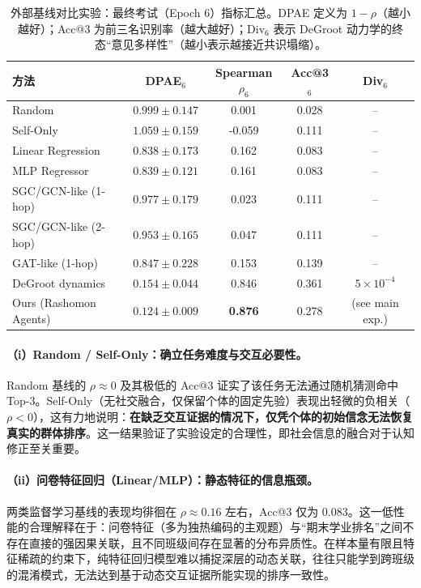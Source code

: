 \documentclass[UTF8, a4paper, 11pt]{ctexart}
\begin{document}
\begin{table}[!htbp]
\centering
\small
\begin{tabular}{lcccc}
\toprule
方法 & DPAE$_6$ & Spearman $\rho_6$ & Acc@3$_6$ & Div$_6$ \\
\midrule
Random & $0.999\pm0.147$ & 0.001 & 0.028 & -- \\
Self-Only & $1.059\pm0.159$ & -0.059 & 0.111 & -- \\
Linear Regression & $0.838\pm0.173$ & 0.162 & 0.083 & -- \\
MLP Regressor & $0.839\pm0.121$ & 0.161 & 0.083 & -- \\
\midrule
SGC/GCN-like (1-hop) & $0.977\pm0.179$ & 0.023 & 0.111 & -- \\
SGC/GCN-like (2-hop) & $0.953\pm0.165$ & 0.047 & 0.111 & -- \\
GAT-like (1-hop) & $0.847\pm0.228$ & 0.153 & 0.139 & -- \\
DeGroot dynamics & $0.154\pm0.044$ & 0.846 & 0.361 & $5\times10^{-4}$ \\
\midrule
Ours (Rashomon Agents) & $\mathbf{0.124\pm0.009}$ & \textbf{0.876} & 0.278 & (see main exp.) \\
\bottomrule
\end{tabular}
\caption{外部基线对比实验：最终考试（Epoch 6）指标汇总。DPAE 定义为 \(1-\rho\)（越小越好）；Acc@3 为前三名识别率（越大越好）；Div$_6$ 表示 DeGroot 动力学的终态“意见多样性”（越小表示越接近共识塌缩）。}
\label{tab:external_baselines}
\end{table}

\paragraph{（i）Random / Self-Only：确立任务难度与交互必要性。}
Random 基线的 \(\rho\approx 0\) 及其极低的 Acc@3 证实了该任务无法通过随机猜测命中 Top-3。Self-Only（无社交融合，仅保留个体的固定先验）表现出轻微的负相关（\(\rho<0\)），这有力地说明：\textbf{在缺乏交互证据的情况下，仅凭个体的初始信念无法恢复真实的群体排序}。这一结果验证了实验设定的合理性，即社会信息的融合对于认知修正至关重要。

\paragraph{（ii）问卷特征回归（Linear/MLP）：静态特征的信息瓶颈。}
两类监督学习基线的表现均徘徊在 \(\rho\approx 0.16\) 左右，Acc@3 仅为 0.083。这一低性能的合理解释在于：问卷特征（多为独热编码的主观题）与“期末学业排名”之间不存在直接的强因果关联，且不同班级间存在显著的分布异质性。在样本量有限且特征稀疏的约束下，纯特征回归模型难以捕捉深层的动态关联，往往只能学到跨班级的混淆模式，无法达到基于动态交互证据所能实现的排序一致性。
\end{document}
